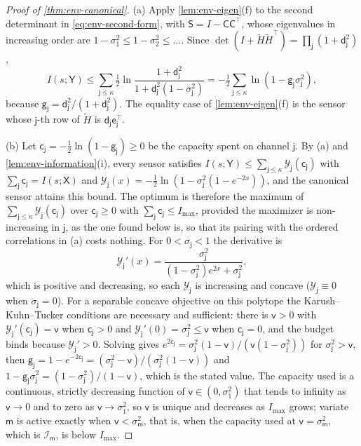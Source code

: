 \begin{proof}[Proof of \cref{thm:env-canonical}]
(a) Apply \cref{lem:env-eigen}(f) to the second determinant in \eqref{eq:env-second-form}, with $\mathsf S=I-\mathsf C\mathsf C^\top$, whose eigenvalues in increasing order are $1-\sigma_1^2\le1-\sigma_2^2\le\dots$. Since $\det(I+\tilde H\tilde H^\top)=\prod_{\mathsf j}(1+\mathsf d_{\mathsf j}^2)$,
\[
I(s;\mathsf Y)\le\sum_{\mathsf j\le\kappa}\tfrac12\ln\frac{1+\mathsf d_{\mathsf j}^2}{1+\mathsf d_{\mathsf j}^2(1-\sigma_{\mathsf j}^2)}=-\tfrac12\sum_{\mathsf j\le\kappa}\ln(1-\mathsf g_{\mathsf j}\sigma_{\mathsf j}^2),
\]
because $\mathsf g_{\mathsf j}=\mathsf d_{\mathsf j}^2/(1+\mathsf d_{\mathsf j}^2)$. The equality case of \cref{lem:env-eigen}(f) is the sensor whose $\mathsf j$-th row of $\tilde H$ is $\mathsf d_{\mathsf j}\mathsf e_{\mathsf j}^\top$.

(b) Let $\mathsf c_{\mathsf j}=-\frac12\ln(1-\mathsf g_{\mathsf j})\ge0$ be the capacity spent on channel $\mathsf j$. By (a) and \cref{lem:env-information}(i), every sensor satisfies $I(s;\mathsf Y)\le\sum_{\mathsf j\le\kappa}\mathcal Y_{\mathsf j}(\mathsf c_{\mathsf j})$ with $\sum_{\mathsf j}\mathsf c_{\mathsf j}=I(s;\mathsf X)$ and $\mathcal Y_{\mathsf j}(x)=-\frac12\ln(1-\sigma_{\mathsf j}^2(1-e^{-2x}))$, and the canonical sensor attains this bound. The optimum is therefore the maximum of $\sum_{\mathsf j\le\kappa}\mathcal Y_{\mathsf j}(\mathsf c_{\mathsf j})$ over $\mathsf c_{\mathsf j}\ge0$ with $\sum_{\mathsf j}\mathsf c_{\mathsf j}\le I_{\max}$, provided the maximizer is non-increasing in $\mathsf j$, as the one found below is, so that its pairing with the ordered correlations in (a) costs nothing. For $0<\sigma_{\mathsf j}<1$ the derivative is
\[
\mathcal Y_{\mathsf j}'(x)=\frac{\sigma_{\mathsf j}^2}{(1-\sigma_{\mathsf j}^2)e^{2x}+\sigma_{\mathsf j}^2},
\]
which is positive and decreasing, so each $\mathcal Y_{\mathsf j}$ is increasing and concave ($\mathcal Y_{\mathsf j}\equiv0$ when $\sigma_{\mathsf j}=0$). For a separable concave objective on this polytope the Karush--Kuhn--Tucker conditions are necessary and sufficient: there is $\mathsf v>0$ with $\mathcal Y_{\mathsf j}'(\mathsf c_{\mathsf j})=\mathsf v$ when $\mathsf c_{\mathsf j}>0$ and $\mathcal Y_{\mathsf j}'(0)=\sigma_{\mathsf j}^2\le\mathsf v$ when $\mathsf c_{\mathsf j}=0$, and the budget binds because $\mathcal Y_{\mathsf j}'>0$. Solving gives $e^{2\mathsf c_{\mathsf j}}=\sigma_{\mathsf j}^2(1-\mathsf v)/(\mathsf v(1-\sigma_{\mathsf j}^2))$ for $\sigma_{\mathsf j}^2>\mathsf v$, then $\mathsf g_{\mathsf j}=1-e^{-2\mathsf c_{\mathsf j}}=(\sigma_{\mathsf j}^2-\mathsf v)/(\sigma_{\mathsf j}^2(1-\mathsf v))$ and $1-\mathsf g_{\mathsf j}\sigma_{\mathsf j}^2=(1-\sigma_{\mathsf j}^2)/(1-\mathsf v)$, which is the stated value. The capacity used is a continuous, strictly decreasing function of $\mathsf v\in(0,\sigma_1^2)$ that tends to infinity as $\mathsf v\to0$ and to zero as $\mathsf v\to\sigma_1^2$, so $\mathsf v$ is unique and decreases as $I_{\max}$ grows; variate $\mathsf m$ is active exactly when $\mathsf v<\sigma_{\mathsf m}^2$, that is, when the capacity used at $\mathsf v=\sigma_{\mathsf m}^2$, which is $\mathcal I_{\mathsf m}$, is below $I_{\max}$.


\end{proof}
